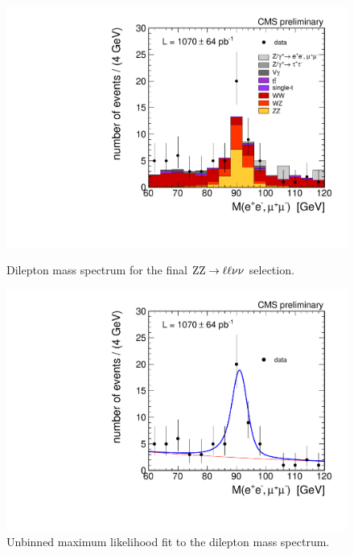 \begin{figure}[t]
\begin{minipage}[t]{0.48\linewidth}
\centering
\includegraphics[width=1\linewidth]{figures/ZZ_2l2n/mll_final.pdf}
\caption{Dilepton mass spectrum for the final $\mathrm{Z}\mathrm{Z}\to\ell\ell\nu\nu$ selection. \label{fig:ZZ_2l2n_mll_final}}
\end{minipage}
\hspace{0.5cm}
\begin{minipage}[t]{0.48\linewidth}
\centering
\includegraphics[width=1\linewidth]{figures/ZZ_2l2n/fitMll.pdf}
\caption{Unbinned maximum likelihood fit to the dilepton mass spectrum. \label{fig:mll_fit}}
\end{minipage}
\end{figure}

\def\NELE{\ensuremath{37}}
\def\NELEWIN{\ensuremath{23}}
\def\NMUO{\ensuremath{34}}
\def\NMUOWIN{\ensuremath{21}}

